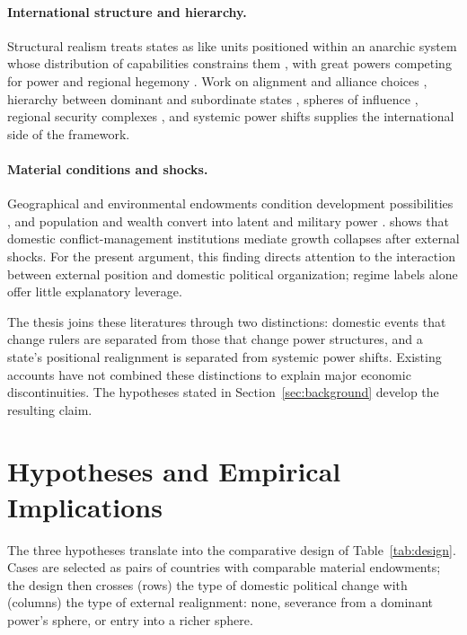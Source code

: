 \documentclass[11pt]{article}
\begin{document}
\paragraph{International structure and hierarchy.} Structural realism treats states as like units positioned within an anarchic system whose distribution of capabilities constrains them \parencite{waltz_1979}, with great powers competing for power and regional hegemony \parencite{mearsheimer_2001}. Work on alignment and alliance choices \parencite{walt_1987}, hierarchy between dominant and subordinate states \parencite{lake_2009}, spheres of influence \parencite{keal_1983,hast_2014}, regional security complexes \parencite{buzan_waever_2003}, and systemic power shifts \parencite{gilpin_1981} supplies the international side of the framework.

\paragraph{Material conditions and shocks.} Geographical and environmental endowments condition development possibilities \parencite{diamond_1997}, and population and wealth convert into latent and military power \parencite{mearsheimer_2001}. \textcite{rodrik_1999} shows that domestic conflict-management institutions mediate growth collapses after external shocks. For the present argument, this finding directs attention to the interaction between external position and domestic political organization; regime labels alone offer little explanatory leverage.

The thesis joins these literatures through two distinctions: domestic events that change rulers are separated from those that change power structures, and a state's positional realignment is separated from systemic power shifts. Existing accounts have not combined these distinctions to explain major economic discontinuities. The hypotheses stated in Section~\ref{sec:background} develop the resulting claim.

\section{Hypotheses and Empirical Implications}
\label{sec:hypotheses}

The three hypotheses translate into the comparative design of Table~\ref{tab:design}. Cases are selected as pairs of countries with comparable material endowments; the design then crosses (rows) the type of domestic political change with (columns) the type of external realignment: none, severance from a dominant power's sphere, or entry into a richer sphere.
\end{document}
